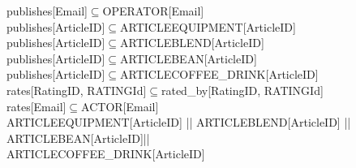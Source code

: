 publishes[Email]$\subseteq$OPERATOR[Email]\\
publishes[ArticleID]$\subseteq$ARTICLEEQUIPMENT[ArticleID]\\
publishes[ArticleID]$\subseteq$ARTICLEBLEND[ArticleID]\\
publishes[ArticleID]$\subseteq$ARTICLEBEAN[ArticleID]\\
publishes[ArticleID]$\subseteq$ARTICLECOFFEE\_DRINK[ArticleID]\\
rates[RatingID, RATINGId]$\subseteq$rated\_by[RatingID, RATINGId]\\
rates[Email]$\subseteq$ACTOR[Email]\\
ARTICLEEQUIPMENT[ArticleID] || ARTICLEBLEND[ArticleID] || ARTICLEBEAN[ArticleID]|| \\
ARTICLECOFFEE\_DRINK[ArticleID]\\
